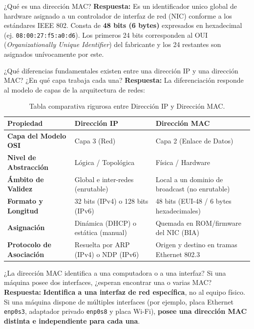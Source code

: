 \documentclass[11pt,a4paper]{article}
\begin{document}
\begin{pregunta}{¿Qué es una dirección MAC?}
    \textbf{Respuesta:} Es un identificador unico global de hardware asignado a un controlador de interfaz de red (NIC) conforme a los estándares IEEE 802. Consta de \textbf{48 bits (6 bytes)} expresados en hexadecimal (ej. \texttt{08:00:27:f5:a0:d6}). Los primeros 24 bits corresponden al OUI (\textit{Organizationally Unique Identifier}) del fabricante y los 24 restantes son asignados unívocamente por este.
\end{pregunta}

\begin{pregunta}{¿Qué diferencias fundamentales existen entre una dirección IP y una dirección MAC? ¿En qué capa trabaja cada una?}
    \textbf{Respuesta:} La diferenciación responde al modelo de capas de la arquitectura de redes:
    
    \begin{table}[H]
        \centering
        \footnotesize
        \caption{Tabla comparativa rigurosa entre Dirección IP y Dirección MAC.}
        \label{tab:ip_vs_mac}
        \begin{tabularx}{\textwidth}{lXX}
            \toprule
            \rowcolor{tableheader}
            \textbf{Propiedad} & \textbf{Dirección IP} & \textbf{Dirección MAC} \\
            \midrule
            \textbf{Capa del Modelo OSI} & Capa 3 (Red) & Capa 2 (Enlace de Datos) \\
            \textbf{Nivel de Abstracción} & Lógica / Topológica & Física / Hardware \\
            \textbf{Ámbito de Validez} & Global e inter-redes (enrutable) & Local a un dominio de broadcast (no enrutable) \\
            \textbf{Formato y Longitud} & 32 bits (IPv4) o 128 bits (IPv6) & 48 bits (EUI-48 / 6 bytes hexadecimales) \\
            \textbf{Asignación} & Dinámica (DHCP) o estática (manual) & Quemada en ROM/firmware del NIC (BIA) \\
            \textbf{Protocolo de Asociación} & Resuelta por ARP (IPv4) o NDP (IPv6) & Origen y destino en tramas Ethernet 802.3 \\
            \bottomrule
        \end{tabularx}
    \end{table}
\end{pregunta}

\begin{pregunta}{¿La dirección MAC identifica a una computadora o a una interfaz? Si una máquina posee dos interfaces, ¿esperan encontrar una o varias MAC?}
    \textbf{Respuesta:} \textbf{Identifica a una interfaz de red específica}, no al equipo físico. Si una máquina dispone de múltiples interfaces (por ejemplo, placa Ethernet \texttt{enp0s3}, adaptador privado \texttt{enp0s8} y placa Wi-Fi), \textbf{posee una dirección MAC distinta e independiente para cada una}.
\end{pregunta}
\end{document}
